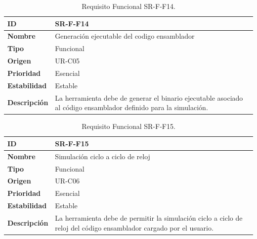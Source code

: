 \begin{center}
\begin{table}[htbp]
\centering
\begin{tabular}{@{}p{2.5cm} p{9cm}@{}} 
\toprule
\textbf{ID} 				& SR-F-F14 \\
\midrule
\textbf{Nombre} 			& Generación ejecutable del codigo ensamblador\\
\midrule
\textbf{Tipo} 			& Funcional \\
\midrule
\textbf{Origen} 			& UR-C05 \\
\midrule
\textbf{Prioridad}		& Esencial \\
\midrule
\textbf{Estabilidad} 		& Estable \\
\midrule
\textbf{Descripción} 	& La herramienta debe de generar el binario ejecutable asociado al código ensamblador definido para la simulación. \\
\bottomrule
\end{tabular}
\caption{Requisito Funcional SR-F-F14.}
\label{tab:srff14}
\end{table}
\end{center}

\begin{center}
\begin{table}[htbp]
\centering
\begin{tabular}{@{}p{2.5cm} p{9cm}@{}} 
\toprule
\textbf{ID} 				& SR-F-F15 \\
\midrule
\textbf{Nombre} 			& Simulación ciclo a ciclo de reloj\\
\midrule
\textbf{Tipo} 			& Funcional \\
\midrule
\textbf{Origen} 			& UR-C06 \\
\midrule
\textbf{Prioridad}		& Esencial \\
\midrule
\textbf{Estabilidad} 		& Estable \\
\midrule
\textbf{Descripción} 	& La herramienta debe de permitir la simulación ciclo a ciclo de reloj del código ensamblador cargado por el usuario. \\
\bottomrule
\end{tabular}
\caption{Requisito Funcional SR-F-F15.}
\label{tab:srff15}
\end{table}
\end{center}

